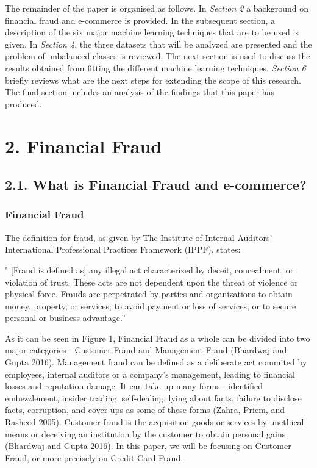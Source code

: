 \documentclass[12pt,]{article}
\begin{document}
The remainder of the paper is organised as follows. In \emph{Section 2}
a background on financial fraud and e-commerce is provided. In the
subsequent section, a description of the six major machine learning
techniques that are to be used is given. In \emph{Section 4}, the three
datasets that will be analyzed are presented and the problem of
imbalanced classes is reviewed. The next section is used to discuss the
results obtained from fitting the different machine learning techniques.
\emph{Section 6} briefly reviews what are the next steps for extending
the scope of this research. The final section includes an analysis of
the findings that this paper has produced.

\hypertarget{financial-fraud}{%
\section{2. Financial Fraud}\label{financial-fraud}}

\hypertarget{what-is-financial-fraud-and-e-commerce}{%
\subsection{2.1. What is Financial Fraud and
e-commerce?}\label{what-is-financial-fraud-and-e-commerce}}

\hypertarget{financial-fraud-1}{%
\subsubsection{Financial Fraud}\label{financial-fraud-1}}

The definition for fraud, as given by The Institute of Internal
Auditors' International Professional Practices Framework (IPPF), states:

" {[}Fraud is defined as{]} any illegal act characterized by deceit,
concealment, or violation of trust. These acts are not dependent upon
the threat of violence or physical force. Frauds are perpetrated by
parties and organizations to obtain money, property, or services; to
avoid payment or loss of services; or to secure personal or business
advantage.''

As it can be seen in Figure 1, Financial Fraud as a whole can be divided
into two major categories - Customer Fraud and Management Fraud
(Bhardwaj and Gupta 2016). Management fraud can be defined as a
deliberate act commited by employees, internal auditors or a company's
management, leading to financial losses and reputation damage. It can
take up many forms - identified embezzlement, insider trading,
self-dealing, lying about facts, failure to disclose facts, corruption,
and cover-ups as some of these forms (Zahra, Priem, and Rasheed 2005).
Customer fraud is the acquisition goods or services by unethical means
or deceiving an institution by the customer to obtain personal gains
(Bhardwaj and Gupta 2016). In this paper, we will be focusing on
Customer Fraud, or more precisely on Credit Card Fraud.
\end{document}
